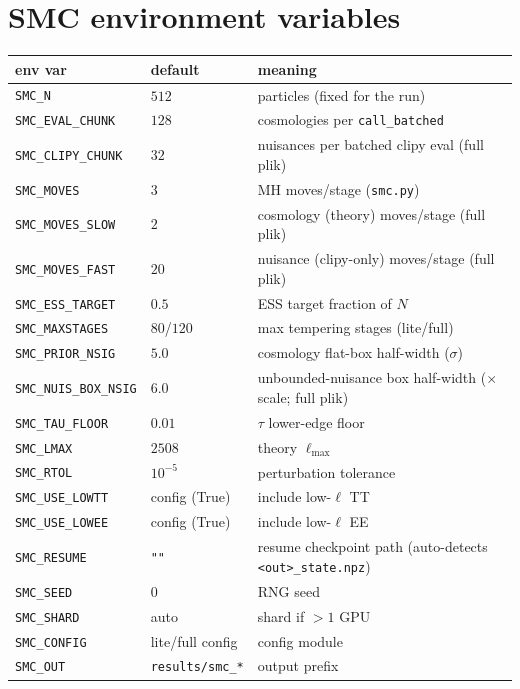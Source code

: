 \documentclass[11pt]{article}
\newcommand{\code}[1]{\texttt{\small #1}}
\newcommand{\Lmax}{\ell_{\max}}
\begin{document}
\section{SMC environment variables}
\label{app:smcenv}
\begin{longtable}{p{}p{}p{}}
\toprule
env var & default & meaning \\
\midrule
\endhead
\code{SMC\_N} & $512$ & particles (fixed for the run) \\
\code{SMC\_EVAL\_CHUNK} & $128$ & cosmologies per \code{call\_batched} \\
\code{SMC\_CLIPY\_CHUNK} & $32$ & nuisances per batched clipy eval (full plik) \\
\code{SMC\_MOVES} & $3$ & MH moves/stage (\code{smc.py}) \\
\code{SMC\_MOVES\_SLOW} & $2$ & cosmology (theory) moves/stage (full plik) \\
\code{SMC\_MOVES\_FAST} & $20$ & nuisance (clipy-only) moves/stage (full plik) \\
\code{SMC\_ESS\_TARGET} & $0.5$ & ESS target fraction of $N$ \\
\code{SMC\_MAXSTAGES} & $80$/$120$ & max tempering stages (lite/full) \\
\code{SMC\_PRIOR\_NSIG} & $5.0$ & cosmology flat-box half-width ($\sigma$) \\
\code{SMC\_NUIS\_BOX\_NSIG} & $6.0$ & unbounded-nuisance box half-width ($\times$scale; full plik) \\
\code{SMC\_TAU\_FLOOR} & $0.01$ & $\tau$ lower-edge floor \\
\code{SMC\_LMAX} & $2508$ & theory $\Lmax$ \\
\code{SMC\_RTOL} & $10^{-5}$ & perturbation tolerance \\
\code{SMC\_USE\_LOWTT} & config (True) & include low-$\ell$ TT \\
\code{SMC\_USE\_LOWEE} & config (True) & include low-$\ell$ EE \\
\code{SMC\_RESUME} & \texttt{""} & resume checkpoint path (auto-detects \code{<out>\_state.npz}) \\
\code{SMC\_SEED} & $0$ & RNG seed \\
\code{SMC\_SHARD} & auto & shard if $>1$ GPU \\
\code{SMC\_CONFIG} & lite/full config & config module \\
\code{SMC\_OUT} & \code{results/smc\_*} & output prefix \\
\bottomrule
\end{longtable}
\end{document}
